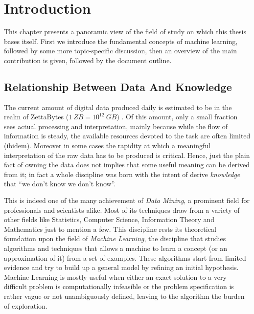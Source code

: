 
\chapter{Introduction} %
\label{Chapter1} %

This chapter presents a panoramic view of the field of study on which this thesis
bases itself.
First we introduce the fundamental concepts of machine learning, followed by
some more topic-specific discussion, then an overview of the main contribution
is given, followed by the document outline.

\section{Relationship Between Data And Knowledge}

The current amount of digital data produced daily is estimated to be in the realm of 
ZettaBytes ($1~ZB = 10^{12}~GB$) \cite{datastudy}.
Of this amount, only a small fraction sees actual processing and interpretation,
mainly because while the flow of information is steady, the available resources
devoted to the task are often limited (ibidem).
Moreover in some cases the rapidity at which a meaningful interpretation of the 
raw data has to be produced is critical.
Hence, just the plain fact of owning the data does not implies that some useful 
meaning can be derived from it; in fact a whole discipline was born with the
intent of derive \emph{knowledge} that ``we don't know we don't know''.

This is indeed one of the many achievement of \emph{Data Mining}, a prominent field for
professionals and scientists alike.
Most of its techniques draw from a variety of other fields like Statistics,
Computer Science, Information Theory and Mathematics just to mention a few.
This discipline rests its theoretical foundation upon the field of \emph{Machine Learning},
the discipline that studies algorithms and techniques that allows a machine
to learn a concept (or an approximation of it) from a set of examples.
These algorithms start from limited evidence and try to build up a general model
by refining an initial hypothesis.
Machine Learning is mostly useful when either an exact solution to a very
difficult problem is computationally infeasible or the problem specification
is rather vague or not unambiguously defined, leaving to the algorithm the burden
of exploration.

